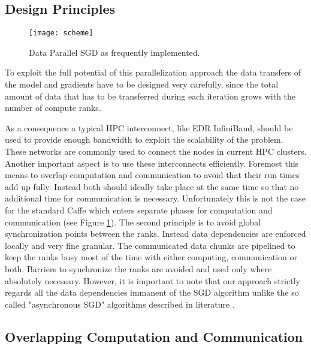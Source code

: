 \documentclass[twoside,twocolumn]{article}
\begin{document}


\subsection{Design Principles}

\begin{figure}[htbp]
\centering%
\texttt{[image: scheme]}
\caption{Data Parallel SGD as frequently implemented.}\label{fig:traditionalParallelSGD}
\end{figure}

To exploit the full potential of this parallelization
approach the data transfers of the model
and gradients have to be designed very carefully, since
the total amount of data that has to be transferred during each iteration
grows with the number of compute ranks.

As a consequence a typical HPC interconnect, like EDR InfiniBand, should
be used to provide enough bandwidth to exploit the scalability of the problem.
These networks are commonly used to connect the nodes in
current HPC clusters.
Another important aspect is to use these interconnects efficiently. Foremost
this means to overlap computation and communication to avoid that
their run times add up fully. Instead both
should ideally take place at the same time so that no additional time for communication
is necessary. Unfortunately this is not the case for the standard Caffe which
enters separate phases for computation and communication (see Figure \ref{fig:traditionalParallelSGD}).
The second principle is to avoid global synchronization points
between the ranks. Instead data dependencies are enforced locally
and very fine granular. The communicated data chunks are pipelined to keep the ranks
busy most of the time with either computing, communication or both.
Barriers to synchronize the ranks are avoided and used only where
absolutely necessary.
However, it is important to note that our approach strictly regards all the data
dependencies immanent of the SGD algorithm unlike the so called "asynchronous SGD"
algorithms described in literature \cite{ASGD}.

\subsection{Overlapping Computation and Communication}
\label{ch:communication}
\end{document}
